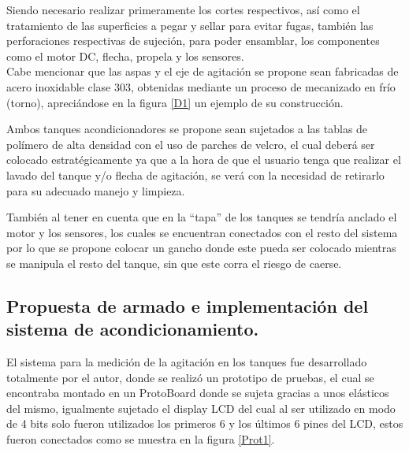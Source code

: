 \documentclass[11pt,letter
								]
								{article}
\begin{document}
 Siendo necesario realizar primeramente los cortes respectivos, así como el tratamiento de las superficies a pegar y sellar para evitar fugas,  también las perforaciones respectivas de sujeción, para poder ensamblar, los componentes como el motor DC, flecha, propela  y los sensores.\\



Cabe mencionar que las aspas y el eje de agitación se propone sean fabricadas  de acero inoxidable clase 303, obtenidas  mediante un proceso de   mecanizado en frío (torno), apreciándose en la figura \ref{D1} un ejemplo de su construcción. 

Ambos tanques acondicionadores se propone sean  sujetados a las tablas de polímero de alta densidad con el uso de parches de velcro, el cual deberá ser  colocado estratégicamente ya que a la hora de que el usuario tenga que realizar el lavado del tanque y/o flecha de agitación, se verá con la necesidad de  retirarlo para su adecuado manejo y limpieza.

También al tener en cuenta  que en la ``tapa'' de los tanques se tendría anclado el motor y los sensores, los cuales se encuentran conectados con el resto del sistema por lo que se propone colocar   un gancho donde este pueda ser colocado mientras se manipula el resto del tanque, sin que este  corra el riesgo de caerse.\\ 



	                                                  
		\subsection[Propuesta de armado e implementación del sistema\\ de acondicionamiento. ]
{Propuesta de armado e implementación del sistema de acondicionamiento. }



El sistema  para la medición de la agitación en los tanques fue desarrollado totalmente por el autor, donde  se realizó un  prototipo de pruebas, el cual se encontraba montado en un ProtoBoard donde se sujeta gracias a unos elásticos del mismo, igualmente sujetado el display LCD del cual al ser utilizado en modo de 4 bits solo fueron utilizados los primeros 6 y los últimos 6 pines del LCD, estos fueron conectados como se muestra en la figura \ref{Prot1}.
\end{document}
